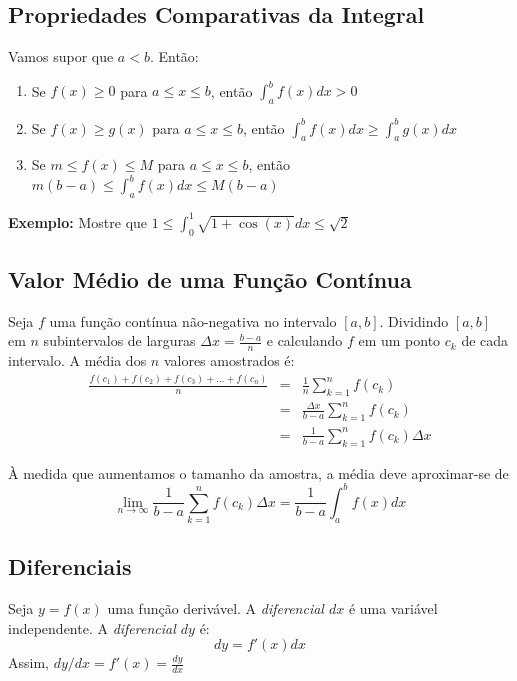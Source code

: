 \documentclass[oneside,a4paper,12pt]{article}
\begin{document}
\vspace{400pt}

\subsection{Propriedades Comparativas da Integral}

Vamos supor que $a<b$. Então:
\begin{enumerate}
	\item Se $f(x) \geq 0$ para $a \leq x \leq b$, então $\int_{a}^{b}f(x)dx > 0$
	\item Se $f(x) \geq g(x)$ para $a \leq x \leq b$, então $\int_{a}^{b}f(x)dx \geq \int_{a}^{b}g(x)dx$
	\item Se $m \leq f(x) \leq M$ para $a \leq x \leq b$, então
	$m(b-a) \leq \int_{a}^{b}f(x)dx \leq M(b-a)$
\end{enumerate}

{\bf Exemplo: }Mostre que $1 \leq \int_{0}^{1}\sqrt{1 + \cos(x)}dx \leq \sqrt{2}$

\vspace{250pt}

\subsection{Valor Médio de uma Função Contínua}

Seja $f$ uma função contínua não-negativa no intervalo $[a,b]$. Dividindo $[a,b]$ em $n$ subintervalos de larguras $\Delta x = \frac{b-a}{n}$ e calculando $f$ em um ponto $c_k$ de cada intervalo. A média dos $n$ valores amostrados é:
\begin{eqnarray*}
\frac{f(c_1) + f(c_2) + f(c_3) + \dots + f(c_n)}{n} &=& \frac{1}{n}\sum_{k=1}^{n}f(c_k) \\
&=& \frac{\Delta x}{b-a}\sum_{k=1}^{n}f(c_k) \\
&=& \frac{1}{b-a}\sum_{k=1}^{n}f(c_k)\Delta x
\end{eqnarray*}

À medida que aumentamos o tamanho da amostra, a média deve aproximar-se de 
$$\lim\limits_{n \rightarrow \infty}\frac{1}{b-a}\sum_{k=1}^{n}f(c_k)\Delta x = \frac{1}{b-a}\int_{a}^{b}f(x)dx$$


\subsection{Diferenciais}

Seja $y = f(x)$ uma função derivável. A \emph{diferencial $dx$} é uma variável independente. A \emph{diferencial $dy$} é:
$$dy = f'(x)dx$$
Assim, $dy / dx = f'(x) = \frac{dy}{dx}$
\end{document}
